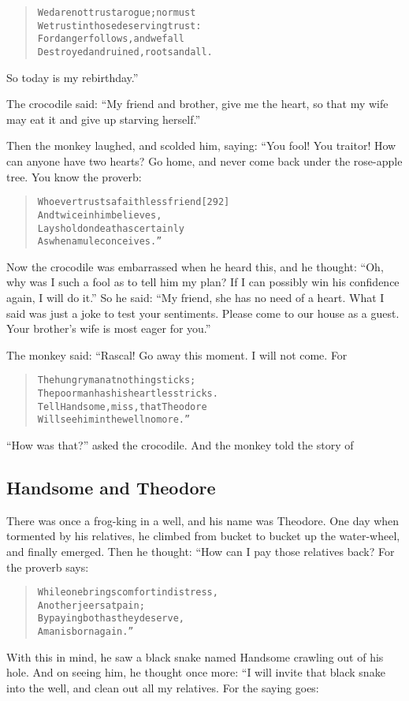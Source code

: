 \documentclass[article, twoside, 14pt]{memoir}
\renewenvironment{verbatim}{%
\begin{quote}%
\vskip -10pt%
\begin{alltt}\normalfont\large}{\end{alltt}%
\end{quote}%
\vskip -10pt
} %
\begin{document}
\begin{verbatim}
We dare not trust a rogue; nor must
We trust in those deserving trust:
For danger follows, and we fall
Destroyed and ruined, roots and all.
\end{verbatim}
So today is my rebirthday.”

The crocodile said:
``My friend and brother, give me the heart, so that my wife may eat it and give up starving herself.''

Then the monkey laughed, and scolded him, saying: “You fool! You
traitor! How can anyone have two hearts? Go home, and never come
back under the rose-apple tree. You know the proverb:

\begin{verbatim}
Whoever trusts a faithless friend                       [292]
    And twice in him believes,
Lays hold on death as certainly
    As when a mule conceives.”
\end{verbatim}
Now the crocodile was embarrassed when he heard this, and he
thought:
``Oh, why was I such a fool as to tell him my plan? If I can possibly win his confidence again, I will do it.''
So he said:
``My friend, she has no need of a heart. What I said was just a joke to test your sentiments. Please come to our house as a guest. Your brother's wife is most eager for you.''

The monkey said: “Rascal! Go away this moment. I will not come.
For

\begin{verbatim}
The hungry man at nothing sticks;
The poor man has his heartless tricks.
Tell Handsome, miss, that Theodore
Will see him in the well no more.”
\end{verbatim}
``How was that?'' asked the crocodile. And the monkey told the
story of

\subsection{Handsome and Theodore}

\label{s67}

There was once a frog-king in a well, and his name was Theodore.
One day when tormented by his relatives, he climbed from bucket to
bucket up the water-wheel, and finally emerged. Then he thought:
“How can I pay those relatives back? For the proverb says:

\begin{verbatim}
While one brings comfort in distress,
    Another jeers at pain;
By paying both as they deserve,
    A man is born again.”
\end{verbatim}
With this in mind, he saw a black snake named Handsome crawling out
of his hole. And on seeing him, he thought once more: “I will
invite that black snake into the well, and clean out all my
relatives. For the saying goes:
\end{document}
